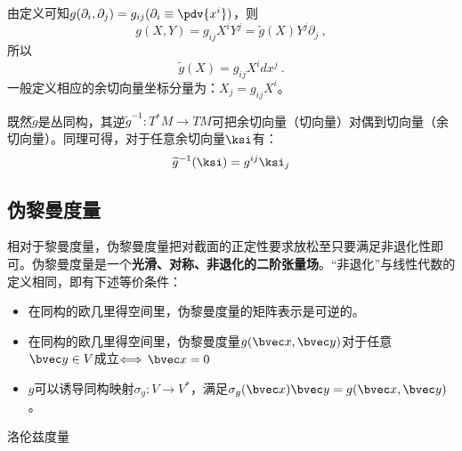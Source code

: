 由定义可知$g(\partial_i,\partial_j)=g_{ij}(\partial_i\equiv\pdv{x^i})$，则
\begin{equation}
g(X,Y)=g_{ij}X^iY^j=\widetilde g(X)Y^j\partial_j~,
\end{equation}
所以
\begin{equation}
\widetilde g(X)=g_{ij}X^idx^j~.
\end{equation}
一般定义相应的余切向量坐标分量为：$X_j=g_{ij}X^i$。

既然$\widetilde g$是丛同构，其逆$\widetilde g^{-1}:T^*M\rightarrow TM$可把余切向量（切向量）对偶到切向量（余切向量）。同理可得，对于任意余切向量$\ksi$有：
\begin{equation}
\widetilde g^{-1}(\ksi)=g^{ij} \ksi_j
\end{equation}


\subsection{伪黎曼度量}
相对于黎曼度量，伪黎曼度量把对截面的正定性要求放松至只要满足非退化性即可。伪黎曼度量是一个\textbf{光滑、对称、非退化的二阶张量场}。“非退化”与线性代数的定义相同，即有下述等价条件：
\begin{itemize}
\item 在同构的欧几里得空间里，伪黎曼度量的矩阵表示是可逆的。
\item 在同构的欧几里得空间里，伪黎曼度量$g(\bvec x,\bvec y)$对于任意$\bvec y\in V$成立$\Longleftrightarrow\,\bvec x=0$
\item $g$可以诱导同构映射$\sigma_g:V\rightarrow V^*$，满足$\sigma_g(\bvec x)\bvec y=g(\bvec x,\bvec y)$。
\end{itemize}
\begin{example}{洛伦兹度量}

\end{example}